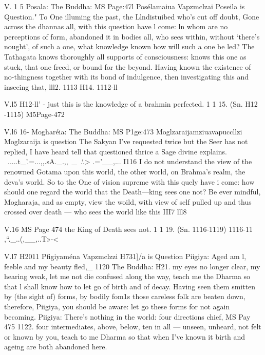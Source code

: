    
   
   V. 1 5
   Posala:
   The Buddha:
   MS Page:47l
   Posélamaiua Vapzmclzai
   Poseila is Question."
   To One illuming the past,
   the Llndistuibed who's cut off doubt,
   Gone across the dhannas all,
   with this question have l come:
   ln whom are no perceptions of form,
   abandoned it in bodies all,
   who sees within, without `there's nought',
   of such a one, what knowledge known
   how will such a one be led?
   The Tathagata knows thoroughly
   all supports of consciousness:
   knows this one as stuck,
   that one freed, or bound for the beyond.
   Having known the existence of no-thingness
   together with its bond of indulgence,
   then investigating this and inseeing that,
   lll2.
   1113
   H14.
   1112-ll
   
   
   
   V.l5 H12-ll'
   - just this is the knowledge of a brahmin perfected.
   1 1 15.
   (Sn. H12 -1115)
   M5Page-472
   
   
   
   V.l6 16-
   Mogharéia:
   The Buddha:
   MS P1ge:473
   Moglzaraijamziuavapuccllzi
   Moglzaraija is question
   The Sakyan I've requested twice
   but the Seer has not replied,
   I have heard tell that questioned thrice
   a Sage divine explains.
   ~.....t_'.=...,,.sA._.,,~_~.`.>  .='__,...%
   I116
   I do not understand the view of the renowned Gotama
   upon this world, the other world,
   on Brahma's realm, the deva's world.
   So to the One of vision supreme
   with this quely have i come:
   how should one regard the world
   that the Death—king sees one not?
   Be ever mindful, Mogharaja,
   and as empty, view the woild,
   with view of self pulled up
   and thus crossed over death —
   who sees the world like this
   III7
   lll8
   
   
   
   V.16
   MS Page 474
   the King of Death sees not. 1 1 19.
   (Sn. 1116-1119)
   1116-11
   ,“._..(,__,..T»-<
   
   
   
   V.l7 H2011
   Pﬁgiyaména Vapzmclzzi
   H731]/a is Question
   Piigiya: Aged am l, feeble and my beauty ﬂed,_
   1120
   The Buddha:
   H21.
   my eyes no longer clear, my hearing weak,
   let me not die confused along the way,
   teach me the Dharma so that l shall know
   how to let go of birth and of decay.
   Having seen them smitten by (the sight of) forms,
   by bodily fom1s those careless folk are beaten down,
   therefore, Piigiya, you should be aware:
   let go these forms for not again becoming.
   Piigiya: There's nothing in the world: four directions chief,
   MS Pay 475
   1122.
   four intermediates, above, below, ten in all —
   unseen, unheard, not felt or known by you,
   teach to me Dharma so that when I've known it
   birth and ageing are both abandoned here.
   
